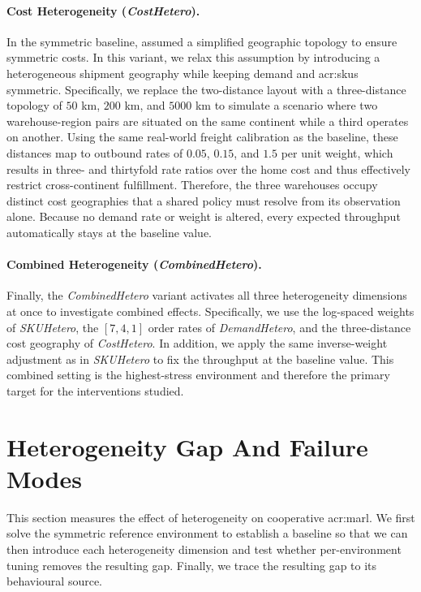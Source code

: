\paragraph{\textbf{Cost Heterogeneity} (\textit{CostHetero}).} In the symmetric baseline, assumed a simplified geographic topology to ensure symmetric costs. In this variant, we relax this assumption by introducing a heterogeneous shipment geography while keeping demand and \glspl{acr:sku} symmetric. Specifically, we replace the two-distance layout with a three-distance topology of $50$ km, $200$ km, and $5000$ km to simulate a scenario where two warehouse-region pairs are situated on the same continent while a third operates on another. Using the same real-world freight calibration as the baseline, these distances map to outbound rates of $0.05$, $0.15$, and $1.5$ per unit weight, which results in three- and thirtyfold rate ratios over the home cost and thus effectively restrict cross-continent fulfillment. Therefore, the three warehouses occupy distinct cost geographies that a shared policy must resolve from its observation alone. Because no demand rate or weight is altered, every expected throughput automatically stays at the baseline value.

\paragraph{\textbf{Combined Heterogeneity} (\textit{CombinedHetero}).} Finally, the \textit{CombinedHetero} variant activates all three heterogeneity dimensions at once to investigate combined effects. Specifically, we use the log-spaced weights of \textit{SKUHetero}, the $[7,4,1]$ order rates of \textit{DemandHetero}, and the three-distance cost geography of \textit{CostHetero}. In addition, we apply the same inverse-weight adjustment as in \textit{SKUHetero} to fix the throughput at the baseline value. This combined setting is the highest-stress environment and therefore the primary target for the interventions studied.\\


\section{Heterogeneity Gap And Failure Modes}
\label{sec:heterogeneity-gap}

This section measures the effect of heterogeneity on cooperative \gls{acr:marl}.
    We first solve the symmetric reference environment to establish a baseline so that we can then introduce each heterogeneity dimension and test whether per-environment tuning removes the resulting
gap. Finally, we trace the resulting gap to its behavioural source.

